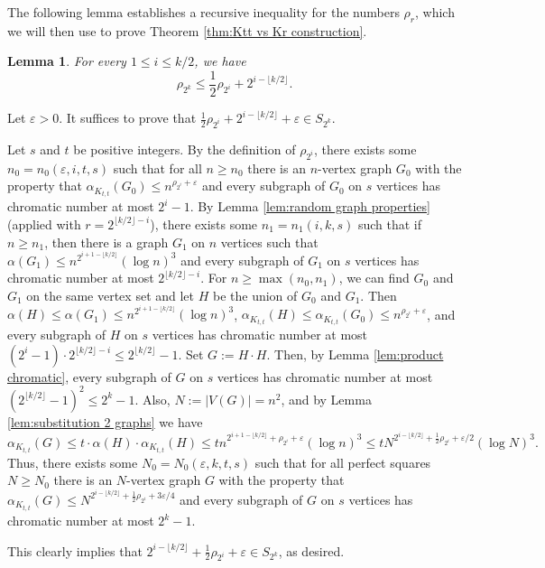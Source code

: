\documentclass[11pt]{article}
\let\oldendproof\endproof
\renewenvironment{proof}[1][\proofname]{\oldproof[\bf #1]}{\oldendproof}
\theoremstyle{plain}
\newtheorem{lemma}[theorem]{Lemma}
\theoremstyle{definition}
\newcommand{\eps}{\varepsilon}
\begin{document}
The following lemma establishes a recursive inequality for the numbers $\rho_r$, which we will then use to prove Theorem \ref{thm:Ktt vs Kr construction}.
\begin{lemma}\label{lem:rho recursion}
	For every $1\leq i\leq k/2$, we have
	$$\rho_{2^k}\leq \frac{1}{2}\rho_{2^i}+2^{i-\lfloor k/2 \rfloor}.$$
\end{lemma}

\begin{proof}
    Let $\eps>0$. It suffices to prove that $\frac{1}{2}\rho_{2^i}+2^{i-\lfloor k/2 \rfloor}+\eps\in S_{2^k}$.

    Let $s$ and $t$ be positive integers.
    By the definition of $\rho_{2^i}$, there exists some $n_0=n_0(\eps,i,t,s)$ such that for all $n\geq n_0$ there is an $n$-vertex graph $G_0$ with the property that $\alpha_{K_{t,t}}(G_0) \leq n^{\rho_{2^i}+\eps}$ and every subgraph of $G_0$ on $s$ vertices has chromatic number at most $2^i-1$. By Lemma \ref{lem:random graph properties} (applied with $r=2^{\lfloor k/2\rfloor-i}$), there exists some $n_1=n_1(i,k,s)$ such that if $n\geq n_1$, then there is a graph $G_1$ on $n$ vertices such that $\alpha(G_1) \leq n^{2^{i+1-\lfloor k/2\rfloor}}(\log n)^3$ and every subgraph of $G_1$ on $s$ vertices has chromatic number at most $2^{\lfloor k/2 \rfloor-i}$. For $n\geq \max(n_0,n_1)$, we can find $G_0$ and $G_1$ on the same vertex set and let $H$ be the union of $G_0$ and $G_1$. Then $\alpha(H) \leq \alpha(G_1)\leq n^{2^{i+1-\lfloor k/2\rfloor}}(\log n)^3$, $\alpha_{K_{t,t}}(H)\leq \alpha_{K_{t,t}}(G_0) \leq n^{\rho_{2^i}+\eps}$, and every subgraph of $H$ on $s$ vertices has chromatic number at most $(2^i-1)\cdot 2^{\lfloor k/2\rfloor-i} \leq 2^{\lfloor k/2\rfloor} - 1$. Set $G := H \cdot H$. Then, by Lemma \ref{lem:product chromatic}, every subgraph of $G$ on $s$ vertices has chromatic number at most $(2^{\lfloor k/2\rfloor} - 1)^2 \leq 2^k-1$. Also, $N := |V(G)| = n^{2}$, and by Lemma \ref{lem:substitution 2 graphs} we have
	$$
	\alpha_{K_{t,t}}(G) \leq t \cdot \alpha(H) \cdot \alpha_{K_{t,t}}(H) \leq t n^{2^{i+1-\lfloor k/2\rfloor} + \rho_{2^i}+\eps}(\log n)^3 \leq t N^{2^{i-\lfloor k/2\rfloor}+\frac{1}{2}\rho_{2^i}+\eps/2}(\log N)^3.
	$$ 
 Thus, there exists some $N_0=N_0(\eps,k,t,s)$ such that for all perfect squares $N\geq N_0$ there is an $N$-vertex graph $G$ with the property that $\alpha_{K_{t,t}}(G)\leq N^{2^{i-\lfloor k/2\rfloor} + \frac{1}{2}\rho_{2^i}+3\eps/4}$ and every subgraph of $G$ on $s$ vertices has chromatic number at most $2^k-1$.
 
 This clearly implies that $2^{i-\lfloor k/2\rfloor} + \frac{1}{2}\rho_{2^i}+\eps\in S_{2^k}$, as desired.
\end{proof}
\end{document}
